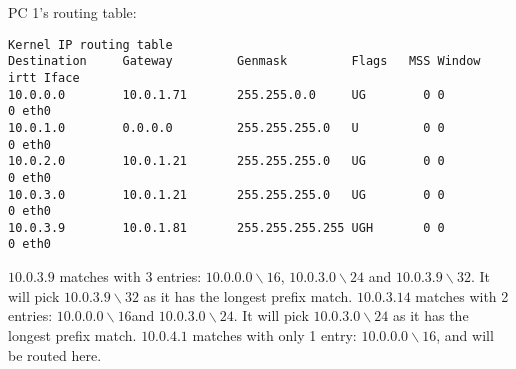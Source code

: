 PC 1's routing table:
\begin{verbatim}
Kernel IP routing table
Destination     Gateway         Genmask         Flags   MSS Window  irtt Iface
10.0.0.0        10.0.1.71       255.255.0.0     UG        0 0          0 eth0
10.0.1.0        0.0.0.0         255.255.255.0   U         0 0          0 eth0
10.0.2.0        10.0.1.21       255.255.255.0   UG        0 0          0 eth0
10.0.3.0        10.0.1.21       255.255.255.0   UG        0 0          0 eth0
10.0.3.9        10.0.1.81       255.255.255.255 UGH       0 0          0 eth0
\end{verbatim}
$10.0.3.9$ matches with 3 entries: $10.0.0.0 \backslash 16$, $10.0.3.0 \backslash 24$ and $10.0.3.9 \backslash 32$. It will pick $10.0.3.9 \backslash 32$ as it has the longest prefix match.
$10.0.3.14$ matches with 2 entries: $10.0.0.0 \backslash 16$and $10.0.3.0 \backslash 24$. It will pick $10.0.3.0 \backslash 24$ as it has the longest prefix match.
$10.0.4.1$ matches with only 1 entry: $10.0.0.0 \backslash 16$, and will be routed here.